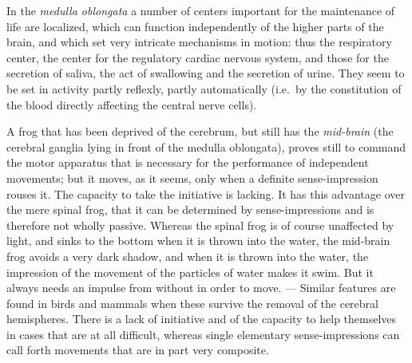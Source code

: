 \documentclass[12pt,a4paper]{book}
\newcommand{\opage}[1]{\marginnote{\footnotesize\textit{[#1]}}}
\begin{document}
In the \emph{medulla oblongata} a number of centers important for the
maintenance of life are localized, which can function independently of
the higher parts of the brain, and which set very intricate mechanisms
in motion: thus the respiratory center, the center for the regulatory
cardiac nervous system, and those for the secretion of saliva, the act
of swallowing and the secretion of urine. They seem to be set in
\opage{48}activity partly reflexly, partly automatically (i.e.\ by the
constitution of the blood directly affecting the central nerve cells).

A frog that has been deprived of the cerebrum, but still has the
\emph{mid-brain} (the cerebral ganglia lying in front of the medulla
oblongata), proves still to command the motor apparatus that is
necessary for the performance of independent movements; but it moves,
as it seems, only when a definite sense-impression rouses it. The
capacity to take the initiative is lacking. It has this advantage over
the mere spinal frog, that it can be determined by sense-impressions and
is therefore not wholly passive. Whereas the spinal frog is of course
unaffected by light, and sinks to the bottom when it is thrown into the
water, the mid-brain frog avoids a very dark shadow, and when it is
thrown into the water, the impression of the movement of the particles
of water makes it swim. But it always needs an impulse from without in
order to move. --- Similar features are found in birds and mammals when
these survive the removal of the cerebral hemispheres. There is a lack
of initiative and of the capacity to help themselves in cases that are
at all difficult, whereas single elementary sense-impressions can call
forth movements that are in part very composite.
\end{document}

